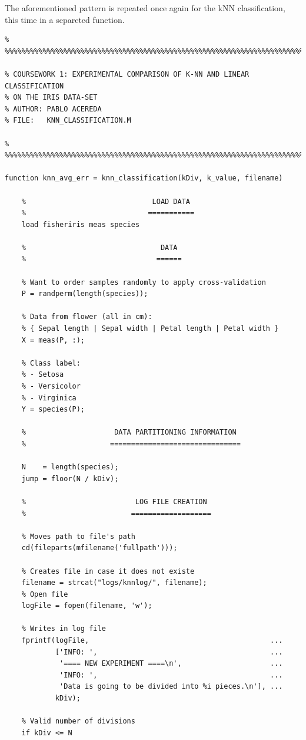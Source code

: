 \documentclass[11pt]{article}
\begin{document}
The aforementioned pattern is repeated once again for the kNN classification,
this time in a separeted function.

\begin{verbatim}
% %%%%%%%%%%%%%%%%%%%%%%%%%%%%%%%%%%%%%%%%%%%%%%%%%%%%%%%%%%%%%%%%%%%%%%%%%

% COURSEWORK 1: EXPERIMENTAL COMPARISON OF K-NN AND LINEAR CLASSIFICATION
% ON THE IRIS DATA-SET
% AUTHOR: PABLO ACEREDA
% FILE:   KNN_CLASSIFICATION.M

% %%%%%%%%%%%%%%%%%%%%%%%%%%%%%%%%%%%%%%%%%%%%%%%%%%%%%%%%%%%%%%%%%%%%%%%%%

function knn_avg_err = knn_classification(kDiv, k_value, filename)

    %                              LOAD DATA
    %                             ===========
    load fisheriris meas species 

    %                                DATA 
    %                               ======

    % Want to order samples randomly to apply cross-validation
    P = randperm(length(species));

    % Data from flower (all in cm):
    % { Sepal length | Sepal width | Petal length | Petal width }
    X = meas(P, :);

    % Class label:
    % - Setosa
    % - Versicolor
    % - Virginica
    Y = species(P);

    %                     DATA PARTITIONING INFORMATION
    %                    ===============================

    N    = length(species);
    jump = floor(N / kDiv);

    %                          LOG FILE CREATION
    %                         ===================

    % Moves path to file's path
    cd(fileparts(mfilename('fullpath')));

    % Creates file in case it does not existe
    filename = strcat("logs/knnlog/", filename);
    % Open file 
    logFile = fopen(filename, 'w');

    % Writes in log file
    fprintf(logFile,                                           ...
            ['INFO: ',                                         ...
             '==== NEW EXPERIMENT ====\n',                     ...
             'INFO: ',                                         ...
             'Data is going to be divided into %i pieces.\n'], ...
            kDiv);

    % Valid number of divisions
    if kDiv <= N


\end{verbatim}
\end{document}
